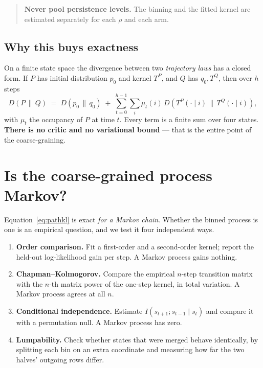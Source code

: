 \documentclass[11pt,a4paper]{article}
\newcommand{\KL}[2]{D\!\left(#1 \,\|\, #2\right)}
\begin{document}
\begin{quote}
\textbf{Never pool persistence levels.} The binning and the fitted kernel are
estimated separately for each $\rho$ and each arm.
\end{quote}

\subsection{Why this buys exactness}

On a finite state space the divergence between two \emph{trajectory laws} has a
closed form. If $P$ has initial distribution $p_0$ and kernel $T^P$, and $Q$ has
$q_0, T^Q$, then over $h$ steps
\begin{equation}
  \KL{P}{Q} \;=\; \KL{p_0}{q_0}
  \;+\; \sum_{t=0}^{h-1} \sum_{i} \mu_t(i) \, \KL{T^P(\cdot \mid i)}{T^Q(\cdot \mid i)},
  \label{eq:pathkl}
\end{equation}
with $\mu_t$ the occupancy of $P$ at time $t$. Every term is a finite sum over
four states. \textbf{There is no critic and no variational bound} --- that is the
entire point of the coarse-graining.

\section{Is the coarse-grained process Markov?}

Equation~\eqref{eq:pathkl} is exact \emph{for a Markov chain}. Whether the binned
process is one is an empirical question, and we test it four independent ways.

\begin{enumerate}
  \item \textbf{Order comparison.} Fit a first-order and a second-order kernel;
        report the held-out log-likelihood gain per step. A Markov process gains
        nothing.
  \item \textbf{Chapman--Kolmogorov.} Compare the empirical $n$-step transition
        matrix with the $n$-th matrix power of the one-step kernel, in total
        variation. A Markov process agrees at all $n$.
  \item \textbf{Conditional independence.} Estimate
        $I(s_{t+1}; s_{t-1} \mid s_t)$ and compare it with a permutation null.
        A Markov process has zero.
  \item \textbf{Lumpability.} Check whether states that were merged behave
        identically, by splitting each bin on an extra coordinate and measuring
        how far the two halves' outgoing rows differ.
\end{enumerate}
\end{document}
